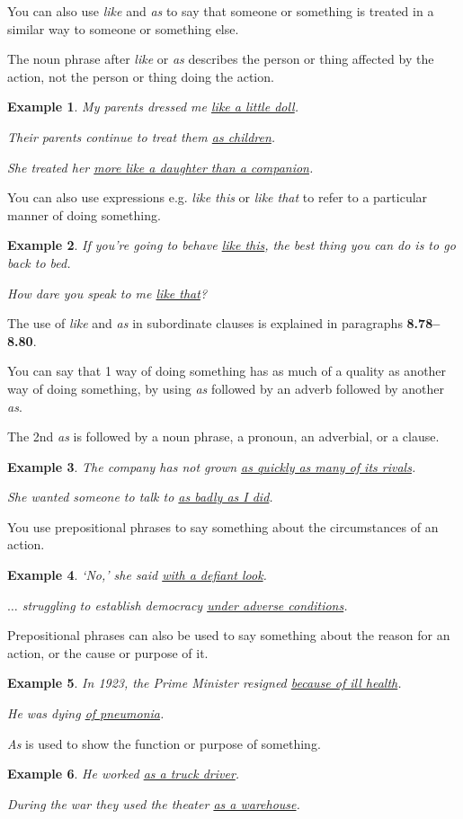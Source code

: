 \documentclass[oneside]{book}
\numberwithin{equation}{section}
\newtheorem{example}{Example}[section]
\begin{document}
%
\noindent{} You can also use \textit{like} and \textit{as} to say that someone or something is treated in a similar way to someone or something else.

The noun phrase after \textit{like} or \textit{as} describes the person or thing affected by the action, not the person or thing doing the action.
\begin{example}
    My parents dressed me \underline{like a little doll}.
    
    Their parents continue to treat them \underline{as children}.
    
    She treated her \underline{more like a daughter than a companion}.
\end{example}
You can also use expressions e.g. \textit{like this} or \textit{like that} to refer to a particular manner of doing something.
\begin{example}
    If you're going to behave \underline{like this}, the best thing you can do is to go back to bed.
    
    How dare you speak to me \underline{like that}?
\end{example}
The use of \textit{like} and \textit{as} in subordinate clauses is explained in paragraphs \textbf{8.78--8.80}.

%
\noindent{} You can say that 1 way of doing something has as much of a quality as another way of doing something, by using \textit{as} followed by an adverb followed by another \textit{as}.

The 2nd \textit{as} is followed by a noun phrase, a pronoun, an adverbial, or a clause.
\begin{example}
    The company has not grown \underline{as quickly as many of its rivals}.
    
    She wanted someone to talk to \underline{as badly as I did}.
\end{example}
%
\noindent{} You use prepositional phrases to say something about the circumstances of an action.
\begin{example}
    `No,' she said \underline{with a defiant look}.
    
    $\ldots$ struggling to establish democracy \underline{under adverse conditions}.
\end{example}
%
\noindent{} Prepositional phrases can also be used to say something about the reason for an action, or the cause or purpose of it.
\begin{example}
    In 1923, the Prime Minister resigned \underline{because of ill health}.
    
    He was dying \underline{of pneumonia}.
\end{example}
\textit{As} is used to show the function or purpose of something.
\begin{example}
    He worked \underline{as a truck driver}.
    
    During the war they used the theater \underline{as a warehouse}.
\end{example}
\end{document}

